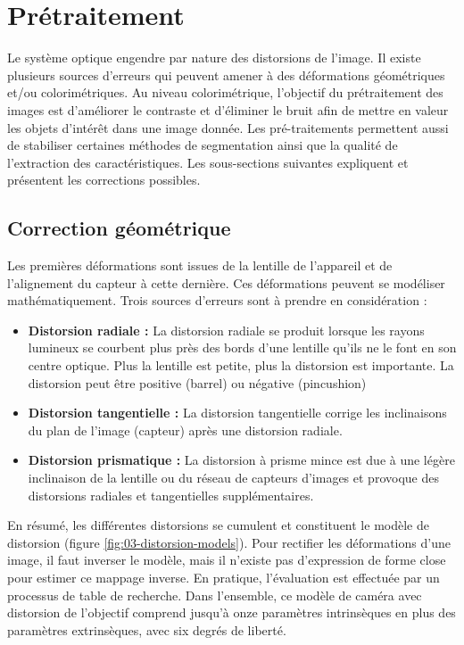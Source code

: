 \documentclass[../thesis.tex]{subfiles}
\begin{document}
    \newpage
    \section{Prétraitement}
    
    Le système optique engendre par nature des distorsions de l'image. Il existe plusieurs sources d'erreurs qui peuvent amener à des déformations géométriques et/ou colorimétriques. Au niveau colorimétrique, l'objectif du prétraitement des images est d'améliorer le contraste et d'éliminer le bruit afin de mettre en valeur les objets d'intérêt dans une image donnée. Les pré-traitements permettent aussi de stabiliser certaines méthodes de segmentation ainsi que la qualité de l'extraction des caractéristiques. Les sous-sections suivantes expliquent et présentent les corrections possibles.
    
    \subsection{Correction géométrique}
    \label{sec:lens-correction}
    
    Les premières déformations sont issues de la lentille de l'appareil et de l'alignement du capteur à cette dernière. Ces déformations peuvent se modéliser mathématiquement. Trois sources d'erreurs sont à prendre en considération :
    
    \begin{itemize}
        \item \textbf{Distorsion radiale :} La distorsion radiale se produit lorsque les rayons lumineux se courbent plus près des bords d'une lentille qu'ils ne le font en son centre optique. Plus la lentille est petite, plus la distorsion est importante. La distorsion peut être positive (barrel) ou négative (pincushion)
        \item \textbf{Distorsion tangentielle :} La distorsion tangentielle corrige les inclinaisons du plan de l'image (capteur) après une distorsion radiale.
        \item \textbf{Distorsion prismatique :} La distorsion à prisme mince est due à une légère inclinaison de la lentille ou du réseau de capteurs d'images et provoque des distorsions radiales et tangentielles supplémentaires.
    \end{itemize}
    
    \par En résumé, les différentes distorsions se cumulent et constituent le modèle de distorsion (figure \ref{fig:03-distorsion-models}). Pour rectifier les déformations d'une image, il faut inverser le modèle, mais il n'existe pas d'expression de forme close pour estimer ce mappage inverse. En pratique, l'évaluation est effectuée par un processus de table de recherche. Dans l'ensemble, ce modèle de caméra avec distorsion de l'objectif comprend jusqu'à onze paramètres intrinsèques en plus des paramètres extrinsèques, avec six degrés de liberté. %
    
\end{document}
